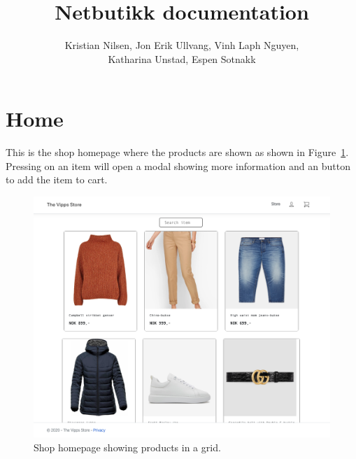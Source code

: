 \documentclass[11pt,a4paper,english]{article}
\title{Netbutikk documentation}
\author{Kristian Nilsen, Jon Erik Ullvang, Vinh Laph Nguyen,\\ Katharina Unstad, Espen Sotnakk}
\begin{document}
\maketitle
{}\selectfont
\section*{Home}
This is the shop homepage where the products are shown as shown in Figure~\ref{fig:home}. Pressing on an item will open a modal showing more information and an button to add the item to cart.
\begin{figure}[htbp]
  \centering
  \includegraphics[scale=0.2]{home}
  \caption{Shop homepage showing products in a grid.}
  \label{fig:home}
\end{figure}
\end{document}
